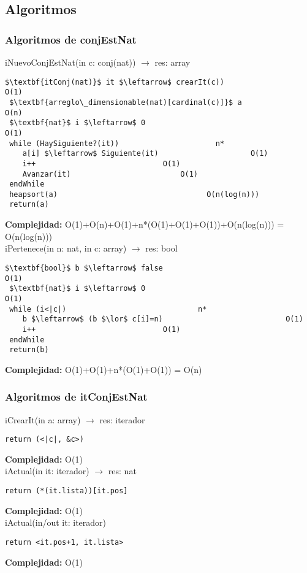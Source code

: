 \subsection{Algoritmos}
\subsubsection{Algoritmos de conjEstNat}
iNuevoConjEstNat(in c: conj(nat)) $\rightarrow$ res: array
\begin{lstlisting}[mathescape]
 $\textbf{itConj(nat)}$ it $\leftarrow$ crearIt(c))								O(1)
 $\textbf{arreglo\_dimensionable(nat)[cardinal(c)]}$ a										O(n)
 $\textbf{nat}$ i $\leftarrow$ 0										O(1)
 while (HaySiguiente?(it))						n*
 	a[i] $\leftarrow$ Siguiente(it)						O(1)
 	i++								O(1)
 	Avanzar(it)							O(1)
 endWhile
 heapsort(a)						  		  O(n(log(n)))
 return(a)
\end{lstlisting}
\textbf{Complejidad:} O(1)+O(n)+O(1)+n*(O(1)+O(1)+O(1))+O(n(log(n))) = O(n(log(n)))\\

iPertenece(in n: nat, in c: array) $\rightarrow$ res: bool
\begin{lstlisting}[mathescape]
 $\textbf{bool}$ b $\leftarrow$ false									O(1)
 $\textbf{nat}$ i $\leftarrow$ 0										O(1)
 while (i<|c|)								n*
 	b $\leftarrow$ (b $\lor$ c[i]=n)							O(1)
 	i++								O(1)
 endWhile
 return(b)
\end{lstlisting}
\textbf{Complejidad:} O(1)+O(1)+n*(O(1)+O(1)) = O(n)\\

\subsubsection{Algoritmos de itConjEstNat}
iCrearIt(in a: array) $\rightarrow$ res: iterador
\begin{lstlisting}[mathescape]
 return (<|c|, &c>)
\end{lstlisting}
\textbf{Complejidad:} O(1)\\

iActual(in it: iterador) $\rightarrow$ res: nat
\begin{lstlisting}[mathescape]
 return (*(it.lista))[it.pos]
\end{lstlisting}
\textbf{Complejidad:} O(1)\\

iActual(in/out it: iterador)
\begin{lstlisting}[mathescape]
 return <it.pos+1, it.lista>
\end{lstlisting}
\textbf{Complejidad:} O(1)\\


